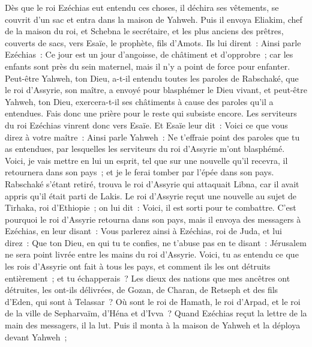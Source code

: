 \begin{multicols}{2}
\VerseOne{}Dès que le roi Ezéchias eut entendu ces choses, il déchira ses vêtements, se couvrit d'un sac et entra dans la maison de Yahweh.
Puis il envoya Eliakim, chef de la maison du roi, et Schebna le secrétaire, et les plus anciens des prêtres, couverts de sacs, vers Esaïe, le prophète, fils d'Amots.
Ils lui dirent~: Ainsi parle Ezéchias~: Ce jour est un jour d'angoisse, de châtiment et d'opprobre~; car les enfants sont près du sein maternel, mais il n'y a point de force pour enfanter.
Peut-être Yahweh, ton Dieu, a-t-il entendu toutes les paroles de Rabschaké, que le roi d'Assyrie, son maître, a envoyé pour blasphémer le Dieu vivant, et peut-être Yahweh, ton Dieu, exercera-t-il ses châtiments à cause des paroles qu'il a entendues. Fais donc une prière pour le reste qui subsiste encore.
Les serviteurs du roi Ezéchias vinrent donc vers Esaïe.
Et Esaïe leur dit~: Voici ce que vous direz à votre maître~: Ainsi parle Yahweh~: Ne t'effraie point des paroles que tu as entendues, par lesquelles les serviteurs du roi d'Assyrie m'ont blasphémé.
Voici, je vais mettre en lui un esprit, tel que sur une nouvelle qu'il recevra, il retournera dans son pays~; et je le ferai tomber par l'épée dans son pays.
Rabschaké s'étant retiré, trouva le roi d'Assyrie qui attaquait Libna, car il avait appris qu'il était parti de Lakis.
Le roi d'Assyrie reçut une nouvelle au sujet de Tirhaka, roi d'Ethiopie~; on lui dit~: Voici, il est sorti pour te combattre. C'est pourquoi le roi d'Assyrie retourna dans son pays, mais il envoya des messagers à Ezéchias, en leur disant~:
Vous parlerez ainsi à Ezéchias, roi de Juda, et lui direz~: Que ton Dieu, en qui tu te confies, ne t'abuse pas en te disant~: Jérusalem ne sera point livrée entre les mains du roi d'Assyrie.
Voici, tu as entendu ce que les rois d'Assyrie ont fait à tous les pays, et comment ils les ont détruits entièrement~; et tu échapperais~?
Les dieux des nations que mes ancêtres ont détruites, les ont-ils délivrées, de Gozan, de Charan, de Retseph et des fils d'Eden, qui sont à Telassar~?
Où sont le roi de Hamath, le roi d'Arpad, et le roi de la ville de Sepharvaïm, d'Héna et d'Ivva~?
Quand Ezéchias reçut la lettre de la main des messagers, il la lut. Puis il monta à la maison de Yahweh et la déploya devant Yahweh~;

\end{multicols}
